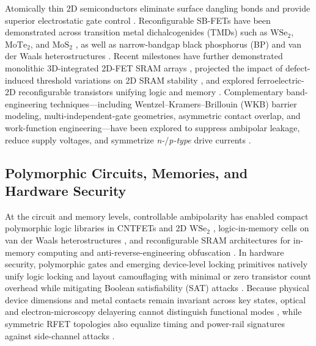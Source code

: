 \documentclass[conference]{IEEEtran}
\begin{document}
Atomically thin 2D semiconductors eliminate surface dangling bonds and provide superior electrostatic gate control \cite{fei2022}. Reconfigurable SB-FETs have been demonstrated across transition metal dichalcogenides (TMDs) such as $\text{WSe}_2$, $\text{MoTe}_2$, and $\text{MoS}_2$ \cite{nakaharai2015, du2014, das2014, guo2025, li2025, hsu2024, farronato2026}, as well as narrow-bandgap black phosphorus (BP) and van der Waals heterostructures \cite{wu2021, wang2021b, tian2026reconfigurable}. Recent milestones have further demonstrated monolithic 3D-integrated 2D-FET SRAM arrays \cite{sadaf2025enabling}, projected the impact of defect-induced threshold variations on 2D SRAM stability \cite{zhao2026projected}, and explored ferroelectric-2D reconfigurable transistors unifying logic and memory \cite{leeferroelectric}. Complementary band-engineering techniques---including Wentzel--Kramers--Brillouin (WKB) barrier modeling, multi-independent-gate geometries, asymmetric contact overlap, and work-function engineering---have been explored to suppress ambipolar leakage, reduce supply voltages, and symmetrize \textit{n-}/\textit{p-type} drive currents \cite{demarchi2012, sun2021, svensson2011, derycke2002, schwarz2023, tunga2023, wang2021a, liu2018, li2023b, zhou2023, navarro2020}.

\subsection{Polymorphic Circuits, Memories, and Hardware Security}
At the circuit and memory levels, controllable ambipolarity has enabled compact polymorphic logic libraries in CNTFETs \cite{benjamaa2011, yu2009} and 2D $\text{WSe}_2$ \cite{resta2018, li2023a}, logic-in-memory cells on van der Waals heterostructures \cite{sun2022}, and reconfigurable SRAM architectures for in-memory computing and anti-reverse-engineering obfuscation \cite{nemati2023hybrid}. In hardware security, polymorphic gates and emerging device-level locking primitives natively unify logic locking and layout camouflaging with minimal or zero transistor count overhead while mitigating Boolean satisfiability (SAT) attacks \cite{wu2021, bi2016, kadiyam2025fesatlock, shamsi2019, kamali2020, xie2017}. Because physical device dimensions and metal contacts remain invariant across key states, optical and electron-microscopy delayering cannot distinguish functional modes \cite{quadir2016, vijayakumar2016}, while symmetric RFET topologies also equalize timing and power-rail signatures against side-channel attacks \cite{galderisi2022, tena2014, tena2022}.
\end{document}
